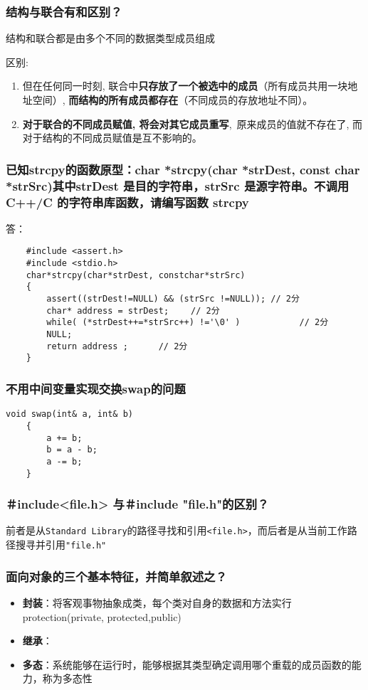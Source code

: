 \documentclass[UTF8,a4paper,8pt]{ctexart}
\begin{document}
		\subsubsection{结构与联合有和区别？}
			结构和联合都是由多个不同的数据类型成员组成
			
			区别:
			\begin{enumerate}[itemindent = 1em]
				\item  但在任何同一时刻, 联合中\textbf{只存放了一个被选中的成员}（所有成员共用一块地址空间）, \textbf{而结构的所有成员都存在}（不同成员的存放地址不同）。
				
				\item  \textbf{对于联合的不同成员赋值, 将会对其它成员重写}, 原来成员的值就不存在了, 而对于结构的不同成员赋值是互不影响的。
			\end{enumerate}
		
		\subsubsection{ 已知strcpy的函数原型：char *strcpy(char *strDest, const char *strSrc)其中strDest 是目的字符串，strSrc 是源字符串。不调用C++/C 的字符串库函数，请编写函数 strcpy}
			答：
			\begin{lstlisting}
	#include <assert.h>
	#include <stdio.h>
	char*strcpy(char*strDest, constchar*strSrc)
	{
		assert((strDest!=NULL) && (strSrc !=NULL)); // 2分
		char* address = strDest; 　　// 2分
		while( (*strDest++=*strSrc++) !='\0' )　　　　　　　// 2分
		NULL; 
		return address ; 　　　// 2分
	}
			\end{lstlisting}
			
		\subsubsection{不用中间变量实现交换swap的问题}
			\begin{lstlisting}[frame=L]
	void swap(int& a, int& b) 
	{  
		a += b;  
		b = a - b;  
		a -= b;  
	}  
			\end{lstlisting}
		\subsubsection{＃include<file.h> 与＃include "file.h"的区别？}
			前者是从\verb|Standard Library|的路径寻找和引用\verb|<file.h>|，而后者是从当前工作路径搜寻并引用\verb|"file.h"|
			
		\subsubsection{面向对象的三个基本特征，并简单叙述之？}
			\begin{itemize}
				\item \textbf{封装}：将客观事物抽象成类，每个类对自身的数据和方法实行protection(private, protected,public)
				\item \textbf{继承}：
				\item \textbf{多态}：系统能够在运行时，能够根据其类型确定调用哪个重载的成员函数的能力，称为多态性
			\end{itemize}
\end{document}
